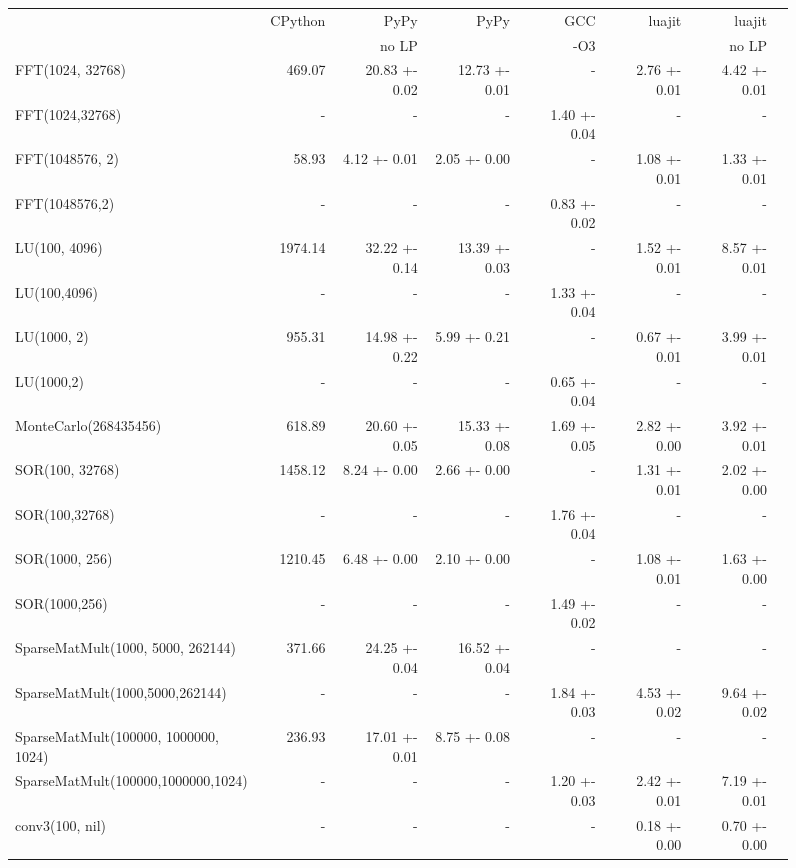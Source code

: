 \documentclass[preprint]{sigplanconf}
\begin{document}
\begin{figure}
\begin{center}
{\smaller
\begin{tabular}{|l|r|r|r|r|r|r|r|}
\hline
 & CPython & PyPy  & PyPy & GCC & luajit & luajit \\
 &        & no LP &       & -O3 &        & no LP \\
FFT(1024, 32768) & 469.07 & 20.83 +- 0.02 & 12.73 +- 0.01 & - & 2.76 +- 0.01 & 4.42 +- 0.01\\
\hline
FFT(1024,32768) & - & - & - & 1.40 +- 0.04 & - & -\\
\hline
FFT(1048576, 2) & 58.93 & 4.12 +- 0.01 & 2.05 +- 0.00 & - & 1.08 +- 0.01 & 1.33 +- 0.01\\
\hline
FFT(1048576,2) & - & - & - & 0.83 +- 0.02 & - & -\\
\hline
LU(100, 4096) & 1974.14 & 32.22 +- 0.14 & 13.39 +- 0.03 & - & 1.52 +- 0.01 & 8.57 +- 0.01\\
\hline
LU(100,4096) & - & - & - & 1.33 +- 0.04 & - & -\\
\hline
LU(1000, 2) & 955.31 & 14.98 +- 0.22 & 5.99 +- 0.21 & - & 0.67 +- 0.01 & 3.99 +- 0.01\\
\hline
LU(1000,2) & - & - & - & 0.65 +- 0.04 & - & -\\
\hline
MonteCarlo(268435456) & 618.89 & 20.60 +- 0.05 & 15.33 +- 0.08 & 1.69 +- 0.05 & 2.82 +- 0.00 & 3.92 +- 0.01\\
\hline
SOR(100, 32768) & 1458.12 & 8.24 +- 0.00 & 2.66 +- 0.00 & - & 1.31 +- 0.01 & 2.02 +- 0.00\\
\hline
SOR(100,32768) & - & - & - & 1.76 +- 0.04 & - & -\\
\hline
SOR(1000, 256) & 1210.45 & 6.48 +- 0.00 & 2.10 +- 0.00 & - & 1.08 +- 0.01 & 1.63 +- 0.00\\
\hline
SOR(1000,256) & - & - & - & 1.49 +- 0.02 & - & -\\
\hline
SparseMatMult(1000, 5000, 262144) & 371.66 & 24.25 +- 0.04 & 16.52 +- 0.04 & - & - & -\\
\hline
SparseMatMult(1000,5000,262144) & - & - & - & 1.84 +- 0.03 & 4.53 +- 0.02 & 9.64 +- 0.02\\
\hline
SparseMatMult(100000, 1000000, 1024) & 236.93 & 17.01 +- 0.01 & 8.75 +- 0.08 & - & - & -\\
\hline
SparseMatMult(100000,1000000,1024) & - & - & - & 1.20 +- 0.03 & 2.42 +- 0.01 & 7.19 +- 0.01\\
\hline
conv3(100, nil) & - & - & - & - & 0.18 +- 0.00 & 0.70 +- 0.00\\

\end{tabular}}
\end{center}
\end{figure}
\end{document}
